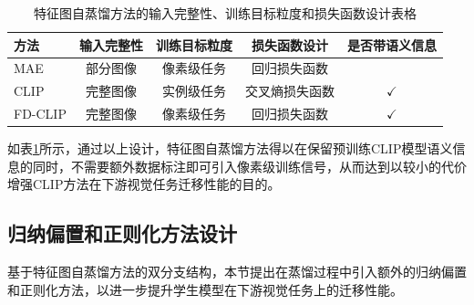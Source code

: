 \begin{table}
\caption{特征图自蒸馏方法的输入完整性、训练目标粒度和损失函数设计表格}
\centering
  \begin{tabular}{lcccc}
\toprule
  方法 & 输入完整性 & 训练目标粒度 & 损失函数设计 & 是否带语义信息 \\
  \midrule
  MAE & 部分图像 & 像素级任务 & 回归损失函数 & \\
  \midrule
  CLIP & 完整图像 & 实例级任务 & 交叉熵损失函数 & $\checkmark$  \\
  FD-CLIP & 完整图像 & 像素级任务 & 回归损失函数 & $\checkmark$ \\
\bottomrule
  \end{tabular}
\label{tab:fd-method}
\end{table}

如表\ref{tab:fd-method}所示，通过以上设计，特征图自蒸馏方法得以在保留预训练CLIP模型语义信息的同时，不需要额外数据标注即可引入像素级训练信号，从而达到以较小的代价增强CLIP方法在下游视觉任务迁移性能的目的。%

\subsection{归纳偏置和正则化方法设计}
基于特征图自蒸馏方法的双分支结构，本节提出在蒸馏过程中引入额外的归纳偏置和正则化方法，以进一步提升学生模型在下游视觉任务上的迁移性能。
